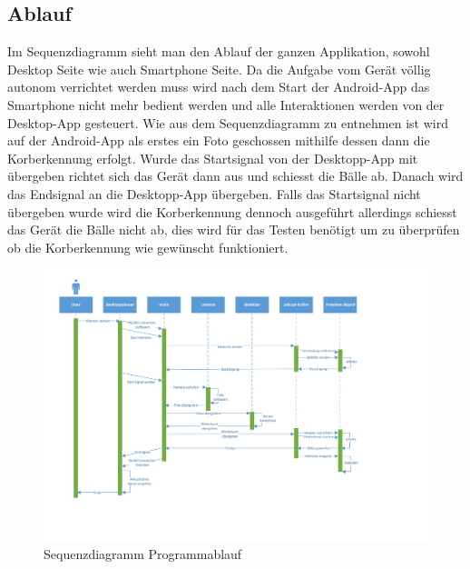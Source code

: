 \subsection{Ablauf}

Im Sequenzdiagramm sieht man den Ablauf der ganzen Applikation, sowohl Desktop Seite wie auch Smartphone Seite. Da die Aufgabe vom Gerät völlig autonom verrichtet werden muss wird nach dem Start der Android-App das Smartphone nicht mehr bedient werden und alle Interaktionen werden von der Desktop-App gesteuert. 
Wie aus dem Sequenzdiagramm zu entnehmen ist wird auf der Android-App als erstes ein Foto geschossen mithilfe dessen dann die Korberkennung erfolgt. Wurde das Startsignal von der Desktopp-App mit übergeben richtet sich das Gerät dann aus und schiesst die Bälle ab. Danach wird das Endsignal an die Desktopp-App übergeben.
Falls das Startsignal nicht übergeben wurde wird die Korberkennung dennoch ausgeführt allerdings schiesst das Gerät die Bälle nicht ab, dies wird für das Testen benötigt um zu überprüfen ob die Korberkennung wie gewünscht funktioniert.


\begin{figure}[h!]
	\includegraphics[width=\textwidth]	{Enddokumentation/Bilder/Sequenzdiagramm_PREN2_v1.pdf}
	\centering
	\caption{Sequenzdiagramm Programmablauf}
	\label{abb:SequenzdiagrammSoftware}
\end{figure}


            
